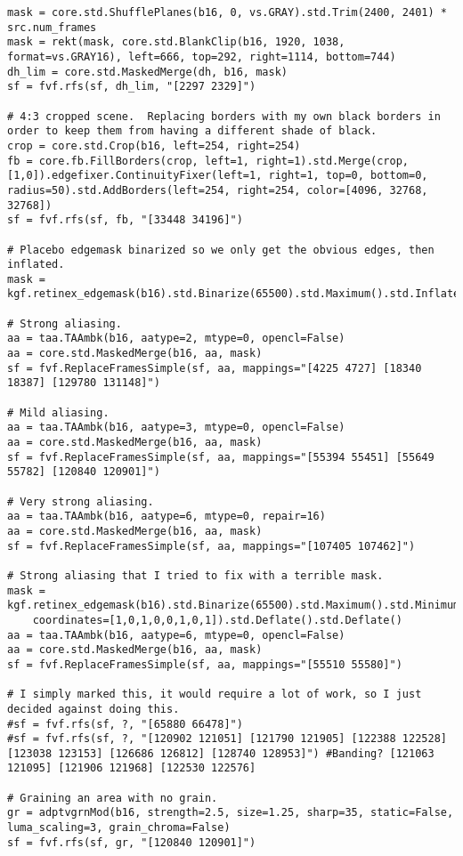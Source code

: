 \documentclass{scrartcl}
\begin{document}
\begin{lstlisting}
mask = core.std.ShufflePlanes(b16, 0, vs.GRAY).std.Trim(2400, 2401) * src.num_frames
mask = rekt(mask, core.std.BlankClip(b16, 1920, 1038, format=vs.GRAY16), left=666, top=292, right=1114, bottom=744)
dh_lim = core.std.MaskedMerge(dh, b16, mask)
sf = fvf.rfs(sf, dh_lim, "[2297 2329]")

# 4:3 cropped scene.  Replacing borders with my own black borders in order to keep them from having a different shade of black.
crop = core.std.Crop(b16, left=254, right=254)
fb = core.fb.FillBorders(crop, left=1, right=1).std.Merge(crop, [1,0]).edgefixer.ContinuityFixer(left=1, right=1, top=0, bottom=0, radius=50).std.AddBorders(left=254, right=254, color=[4096, 32768, 32768])
sf = fvf.rfs(sf, fb, "[33448 34196]")

# Placebo edgemask binarized so we only get the obvious edges, then inflated.
mask = kgf.retinex_edgemask(b16).std.Binarize(65500).std.Maximum().std.Inflate()

# Strong aliasing.
aa = taa.TAAmbk(b16, aatype=2, mtype=0, opencl=False)
aa = core.std.MaskedMerge(b16, aa, mask)
sf = fvf.ReplaceFramesSimple(sf, aa, mappings="[4225 4727] [18340 18387] [129780 131148]")

# Mild aliasing.
aa = taa.TAAmbk(b16, aatype=3, mtype=0, opencl=False)
aa = core.std.MaskedMerge(b16, aa, mask)
sf = fvf.ReplaceFramesSimple(sf, aa, mappings="[55394 55451] [55649 55782] [120840 120901]")

# Very strong aliasing.
aa = taa.TAAmbk(b16, aatype=6, mtype=0, repair=16)
aa = core.std.MaskedMerge(b16, aa, mask)
sf = fvf.ReplaceFramesSimple(sf, aa, mappings="[107405 107462]")

# Strong aliasing that I tried to fix with a terrible mask.
mask = kgf.retinex_edgemask(b16).std.Binarize(65500).std.Maximum().std.Minimum(
	coordinates=[1,0,1,0,0,1,0,1]).std.Deflate().std.Deflate()
aa = taa.TAAmbk(b16, aatype=6, mtype=0, opencl=False)
aa = core.std.MaskedMerge(b16, aa, mask)
sf = fvf.ReplaceFramesSimple(sf, aa, mappings="[55510 55580]")

# I simply marked this, it would require a lot of work, so I just decided against doing this.
#sf = fvf.rfs(sf, ?, "[65880 66478]")
#sf = fvf.rfs(sf, ?, "[120902 121051] [121790 121905] [122388 122528] [123038 123153] [126686 126812] [128740 128953]") #Banding? [121063 121095] [121906 121968] [122530 122576]

# Graining an area with no grain.
gr = adptvgrnMod(b16, strength=2.5, size=1.25, sharp=35, static=False, luma_scaling=3, grain_chroma=False)
sf = fvf.rfs(sf, gr, "[120840 120901]")


\end{lstlisting}
\end{document}
